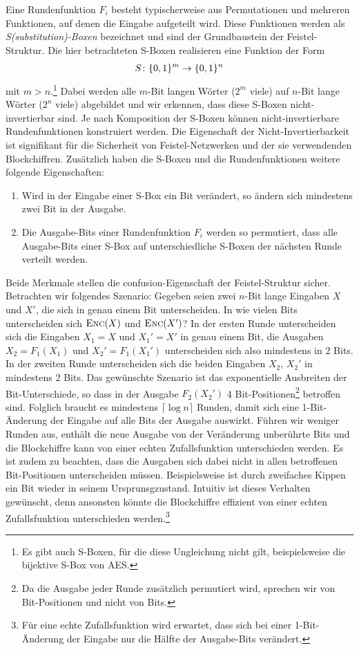 Eine Rundenfunktion \(F_i\) besteht typischerweise aus Permutationen und mehreren Funktionen, auf denen die Eingabe aufgeteilt wird. Diese Funktionen werden als \textit{S(substitution)-Boxen} bezeichnet und sind der Grundbaustein der Feistel-Struktur. Die hier betrachteten S-Boxen realisieren eine Funktion der Form
\begin{align*}
	S \colon \{0, 1\}^m \rightarrow \{0, 1\}^n
\end{align*}
mit \(m > n\).\footnote{Es gibt auch S-Boxen, für die diese Ungleichung nicht gilt, beispielsweise die bijektive S-Box von AES.} Dabei werden alle $m$-Bit langen Wörter (\(2^m\) viele) auf $n$-Bit lange Wörter (\(2^n\) viele) abgebildet und wir erkennen, dass diese S-Boxen nicht-invertierbar sind. Je nach Komposition der S-Boxen können nicht-invertierbare Rundenfunktionen konstruiert werden. Die Eigenschaft der Nicht-Invertierbarkeit ist signifikant für die Sicherheit von Feistel-Netzwerken und der sie verwendenden Blockchiffren. Zusätzlich haben die S-Boxen und die Rundenfunktionen weitere folgende Eigenschaften:
\begin{enumerate}
	\item Wird in der Eingabe einer S-Box ein Bit verändert, so ändern sich mindestens zwei Bit in der Ausgabe.
	\item Die Ausgabe-Bits einer Rundenfunktion $F_i$ werden so permutiert, dass alle Ausgabe-Bits einer S-Box auf unterschiedliche S-Boxen der nächsten Runde verteilt werden.
\end{enumerate}
Beide Merkmale stellen die confusion-Eigenschaft der Feistel-Struktur sicher. 
Betrachten wir folgendes Szenario: Gegeben seien zwei $n$-Bit lange Eingaben $X$ und $X'$, die sich in genau einem Bit unterscheiden. In wie vielen Bits unterscheiden sich $\textsc{Enc}(X)$ und $\textsc{Enc}(X')$? In der ersten Runde unterscheiden sich die Eingaben $X_1 = X$ und $X_1' = X'$ in genau einem Bit, die Ausgaben $X_2 = F_1(X_1)$ und $X_2' = F_1(X_1')$ unterscheiden sich also mindestens in 2 Bits. In der zweiten Runde unterscheiden sich die beiden Eingaben $X_2$, $X_2'$ in mindestens 2 Bits. Das gewünschte Szenario ist das exponentielle Ausbreiten der Bit-Unterschiede, so dass in der Ausgabe $F_2(X_2')$ 4 Bit-Positionen\footnote{Da die Ausgabe jeder Runde zusätzlich permutiert wird, sprechen wir von Bit-Positionen und nicht von Bits.} betroffen sind. Folglich braucht es mindestens $\lceil \log n \rceil$ Runden, damit sich eine 1-Bit-Änderung der Eingabe auf alle Bits der Ausgabe auswirkt. Führen wir weniger Runden aus, enthält die neue Ausgabe von der Veränderung unberührte Bits und die Blockchiffre kann von einer echten Zufallsfunktion unterschieden werden. Es ist zudem zu beachten, dass die Ausgaben sich dabei nicht in allen betroffenen Bit-Positionen unterscheiden müssen. Beispielsweise ist durch zweifaches Kippen ein Bit wieder in seinem Ursprunsgzustand. Intuitiv ist dieses Verhalten gewünscht, denn ansonsten könnte die Blockchiffre effizient von einer echten Zufallsfunktion unterschieden werden.\footnote{Für eine echte Zufallsfunktion wird erwartet, dass sich bei einer 1-Bit-Änderung der Eingabe nur die Hälfte der Ausgabe-Bits verändert.}


